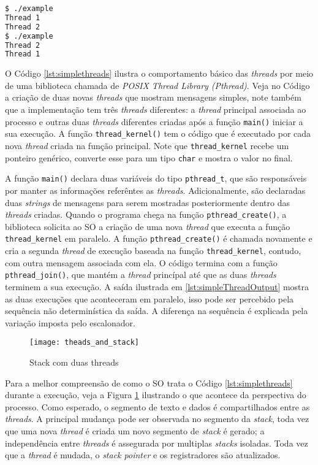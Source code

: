 \begin{lstlisting}[frame=single,
                   language=bash,
                   caption={Saída do exemplo de threads},
                   label={lst:simpleThreadOutput}]
$ ./example 
Thread 1 
Thread 2
$ ./example
Thread 2 
Thread 1
\end{lstlisting}

O Código \ref{lst:simplethreads} ilustra o comportamento básico das
\emph{threads} por meio de uma biblioteca chamada de \emph{POSIX Thread Library
(Pthread)}. Veja no Código a criação de duas novas \emph{threads} que mostram
mensagens simples, note também que a implementação tem três \emph{threads}
diferentes: a \emph{thread} principal associada ao processo e outras duas
\emph{threads} diferentes criadas após a função \texttt{main()} iniciar a sua
execução. A função \texttt{thread\_kernel()} tem o código que é executado por
cada nova \emph{thread} criada na função principal. Note que
\texttt{thread\_kernel} recebe um ponteiro genérico, converte esse para um tipo
\texttt{char} e mostra o valor no final.

A função \texttt{main()} declara duas variáveis do tipo \texttt{pthread\_t}, que
são responsáveis por manter as informações referêntes as \emph{threads}.
Adicionalmente, são declaradas duas \emph{strings} de mensagens para serem
mostradas posteriormente dentro das \emph{threads} criadas. Quando o programa
chega na função \texttt{pthread\_create()}, a biblioteca solicita ao SO a
criação de uma nova \emph{thread} que executa a função \texttt{thread\_kernel}
em paralelo. A função \texttt{pthread\_create()} é chamada novamente e cria a segunda
\emph{thread} de execução baseada na função \texttt{thread\_kernel}, contudo,
com outra mensagem associada com ela. O código termina com a função
\texttt{pthread\_join()}, que mantém a \emph{thread} princípal até que as duas
\emph{threads} terminem a sua execução. A saída ilustrada em
\ref{lst:simpleThreadOutput} mostra as duas execuções que aconteceram em
paralelo, isso pode ser percebido pela sequência não determinística da saída. A
diferença na sequência é explicada pela variação imposta pelo escalonador.

\begin{figure}[!h]
  \centering
  \texttt{[image: theads\_and\_stack]} 
  \caption{Stack com duas threads}
  \label{fig:stack_threads} 
\end{figure}

Para a melhor compreensão de como o SO trata o Código \ref{lst:simplethreads}
durante a execução, veja a Figura \ref{fig:stack_threads} ilustrando o que
acontece da perspectiva do processo. Como esperado, o segmento de texto e dados
é compartilhados entre as \emph{threads}. A principal mudança pode ser
observada no segmento da \emph{stack}, toda vez que uma nova \emph{thread} é
criada um novo segmento de \emph{stack} é gerado; a independência entre
\emph{threads} é assegurada por multiplas \emph{stacks} isoladas. Toda vez que
a \emph{thread} é mudada, o \emph{stack pointer} e os registradores são
atualizados.

